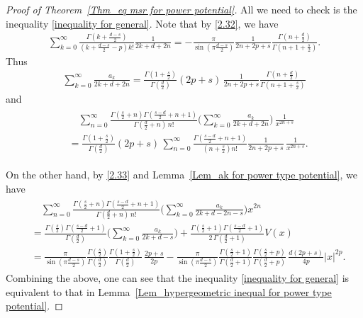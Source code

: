 \documentclass[10pt]{amsart}
\theoremstyle{plain}
\theoremstyle{remark}
\numberwithin{equation}{section}
\begin{document}
\begin{proof}[Proof of Theorem~\ref{Thm_eq msr for power potential}]
    

All we need to check is the inequality \eqref{inequality for general}. 
Note that by \eqref{2.32}, we have 
\begin{align*}
\sum_{k=0}^\infty   \frac{ \Gamma(k+\frac{d-s}{2}) }{ (k+\frac{d-s}{2}-p)k! }  \frac{1}{2k+d+2n} = -\frac{\pi}{ \sin(\pi \frac{d-s}{2})  } \frac{1}{2n+2p+s} \frac{ \Gamma(n+\frac{d}{2}) }{ \Gamma(n+1+\frac{s}{2}) }. 
\end{align*}
Thus 
\begin{align*}
\sum_{k=0}^\infty \frac{a_k}{2k+d+2n}  =     \frac{\Gamma(1+\frac{s}{2})}{ \Gamma( \frac{d}{2} ) } (2p+s)\,   \frac{1}{2n+2p+s} \frac{ \Gamma(n+\frac{d}{2}) }{ \Gamma(n+1+\frac{s}{2}) } 
\end{align*}
and 
\begin{align}
\begin{split}
& \quad  \sum_{n=0}^\infty \frac{ \Gamma(\frac{s}{2}+n) \Gamma( \frac{s-d}{2}+n+1 )  }{ \Gamma(\frac{d}{2}+n) \, n! }  \bigg( \sum_{k=0}^\infty \frac{a_k}{2k+d+2n} \bigg) \, \frac{1}{x^{2n+s}}
\\
&=   \frac{\Gamma(1+\frac{s}{2})}{ \Gamma( \frac{d}{2} ) } (2p+s)\,   \sum_{n=0}^\infty \frac{  \Gamma( \frac{s-d}{2}+n+1 )  }{  (n+\frac{s}{2}) n! }   \frac{1}{2n+2p+s}    \, \frac{1}{x^{2n+s}}.
\end{split}
\end{align}

On the other hand, by \eqref{2.33} and Lemma~\ref{Lem_ak for power type potential}, we have  
\begin{align}
\begin{split}
&\quad \sum_{n=0}^\infty \frac{ \Gamma(\frac{s}{2}+n) \Gamma( \frac{s-d}{2}+n+1 )  }{ \Gamma(\frac{d}{2}+n) \, n! } \bigg( \sum_{k=0}^\infty \frac{a_k}{ 2k+d-2n-s } \bigg) x^{2n} 
\\
&=  \frac{ \Gamma(\frac{s}{2}) \Gamma( \frac{s-d}{2}+1 )  }{ \Gamma(\frac{d}{2})  } \bigg( \sum_{k=0}^\infty \frac{a_k}{ 2k+d-s } \bigg)  +\frac{ \Gamma(\frac{s}{2}+1) \Gamma( \frac{s-d}{2}+1 )  }{ 2\, \Gamma( \frac{d}{2}+1 ) }  V(x)
\\
&=  \frac{\pi}{\sin(\pi\tfrac{d-s}{2})}  \frac{ \Gamma(\frac{s}{2})   }{ \Gamma(\frac{d}{2})  }  \frac{\Gamma(1+\frac{s}{2})}{ \Gamma( \frac{d}{2} ) } \, \frac{2p+s}{ 2p }   - \frac{\pi}{\sin(\pi\tfrac{d-s}{2})} \frac{ \Gamma(\frac{s}{2}+1)    }{  \Gamma( \frac{d}{2}+1 ) }     \frac{ \Gamma(\frac{s}{2}+p)   }{ \Gamma(\frac{d}{2}+p)  } \, \frac{d(2p+s)}{ 4p  }       |x|^{2p}.
\end{split}
\end{align}
Combining the above, one can see that the inequality \eqref{inequality for general} is equivalent to that in Lemma~\ref{Lem_hypergeometric inequal for power type potential}.  
 



\end{proof}
\end{document}
